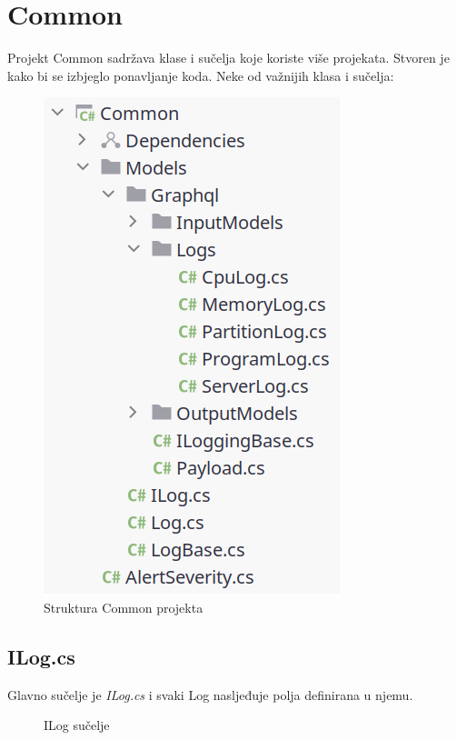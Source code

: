 \documentclass[zavrsnirad]{fer}
\begin{document}
\chapter{Common}
Projekt Common sadržava klase i sučelja koje koriste više projekata. Stvoren je kako bi se izbjeglo ponavljanje koda. Neke od važnijih klasa i sučelja:
\begin{figure}[htb!]
	\centering
	\includegraphics[width=0.4\linewidth]{images/common_structure.png} 
	\caption{Struktura Common projekta}
	\label{slk:common_structure.png}
\end{figure}
\FloatBarrier

\section{ILog.cs}
Glavno sučelje je \textit{ILog.cs} i svaki Log nasljeđuje polja definirana u njemu.
\begin{figure}[htb]
	\centering
	
	\caption{ILog sučelje}
\end{figure}
\FloatBarrier
\end{document}
